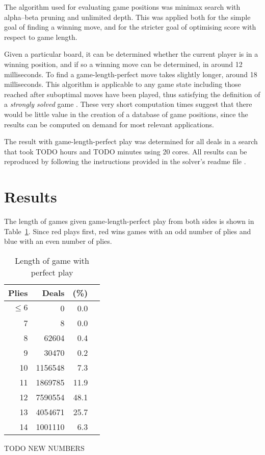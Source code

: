 \documentclass[a4paper, twocolumn]{article}
\begin{document}
The algorithm used for evaluating game positions was minimax search with
alpha--beta pruning and unlimited depth. This was applied both for the simple
goal of finding a winning move, and for the stricter goal of optimising score
with respect to game length.

Given a particular board, it can be determined whether the current player is in
a winning position, and if so a winning move can be determined, in around 12
milliseconds. To find a game-length-perfect move takes slightly longer, around
18 milliseconds. This algorithm is applicable to any game state including those
reached after suboptimal moves have been played, thus satisfying the definition
of a \textit{strongly solved} game \cite{games-solved}. These very short
computation times suggest that there would be little value in the creation of a
database of game positions, since the results can be computed on demand for most
relevant applications.

The result with game-length-perfect play was determined for all deals in a
search that took TODO hours and TODO minutes using 20 cores. All results can be
reproduced by following the instructions provided in the solver's readme file
\cite{github}.


\section{Results}

The length of games given game-length-perfect play from both sides is shown in
Table~\ref{tab:game-length}. Since red plays first, red wins games with an odd
number of plies and blue with an even number of plies.

\begin{table}[ht]
  \centering
  \begin{tabular}{r r r c}
    \hline
    \textbf{Plies} & \textbf{Deals} & \textbf{(\%)} \\
    \hline
    $\leq 6$ & 0 & 0.0 \\
    7 & 8 & 0.0 \\
    8 & 62604 & 0.4 \\
    9 & 30470 & 0.2 \\
    10 & 1156548 & 7.3 \\
    11 & 1869785 & 11.9 \\
    12 & 7590554 & 48.1 \\
    13 & 4054671 & 25.7 \\
    14 & 1001110 & 6.3 \\
    \hline
  \end{tabular}
  TODO NEW NUMBERS
  \caption{Length of game with perfect play}
  \label{tab:game-length}
\end{table}
\end{document}

